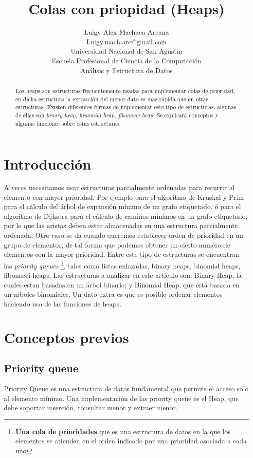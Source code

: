 \documentclass[a4paper,10pt]{article}
\title{Colas con priopidad (Heaps)}
\author{ \Large Luigy Alex Machaca Arcana \\Luigy.mach.arc@gmail.com \\ Universidad Nacional de San Agustín \\ Escuela Profesional de Ciencia de la Computación \\ Análisis y Estructura de Datos }
\begin{document}
\maketitle
\begin{abstract}
Los  heaps son estructuras frecuentemente usadas para implementar colas de prioridad, en dicha estructura la extracción del menor dato es mas rápida que en otras estructuras. Existen diferentes formas de implementar este tipo de estructuras, algunas de ellas son \textit{binary heap, binomial heap, fibonacci heap}. Se explicará conceptos y algunas funciones sobre estas estructuras.
\end{abstract}

\section{Introducción}

A veces necesitamos usar estructuras parcialmente ordenadas para recurrir al elemento con mayor prioridad.
Por ejemplo para el algoritmo de Kruskal y Prim para el cálculo del
árbol de expansión mínimo de un grafo etiquetado, ó para el algoritmo de Dijkstra para el cálculo de caminos
mínimos en un grafo etiquetado, por lo que las aristas deben estar almacenadas en una estructura parcialmente ordenada. Otro caso se da cuando queremos establecer orden de prioridad en un grupo de elementos, de tal forma que podemos obtener un cierto numero de elementos con la mayor prioridad. Entre este tipo de estructuras se encuentran las \textit{priority queues} \footnote{\textbf{Una cola de prioridades} que es una estructura de datos en la que los elementos se atienden en el orden indicado por una prioridad asociada a cada uno}, tales como listas enlazadas, binary heaps, binomial heaps, fibonacci heaps.\cite{diapos} Las estructuras a analizar en este artículo son: Binary Heap, la cuales estan basadas en un árbol binario; y Binomial Heap, que está basada en un arboles binomiales. Un dato extra es que es posible ordenar elementos haciendo uso de las funciones de heaps.

\section{Conceptos previos}
\subsection{Priority queue}
Priority Queue es una estructura de datos fundamental que permite el acceso solo al elemento mínimo.  \cite{cormen}
Una implementación de las priority queue es el Heap, que debe soportar inserción, consultar menor y extraer menor.
\end{document}
